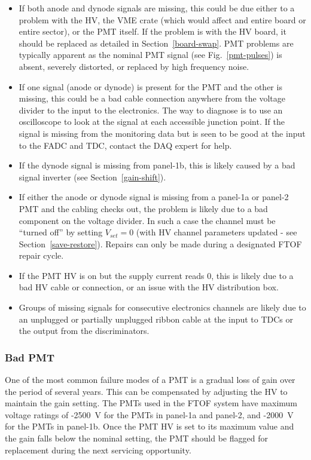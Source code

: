 \documentclass[12pt]{article}
\begin{document}
\begin{itemize}
\item If both anode and dynode signals are missing, this could be due either to a problem 
with the HV, the VME crate (which would affect and entire board or entire sector), or the 
PMT itself. If the problem is with the HV board, it should be replaced as detailed in 
Section~\ref{board-swap}. PMT problems are typically apparent as the nominal PMT signal 
(see Fig.~\ref{pmt-pulses}) is absent, severely distorted, or replaced by high frequency 
noise.
\item If one signal (anode or dynode) is present for the PMT and the other is missing, 
this could be a bad cable connection anywhere from the voltage divider to the input to 
the electronics. The way to diagnose is to use an oscilloscope to look at the signal at 
each accessible junction point. If the signal is missing from the monitoring data but is 
seen to be good at the input to the FADC and TDC, contact the DAQ expert for help.
\item If the dynode signal is missing from panel-1b, this is likely caused by a bad 
signal inverter (see Section~\ref{gain-shift}).
\item If either the anode or dynode signal is missing from a panel-1a or panel-2 PMT and 
the cabling checks out, the problem is likely due to a bad component on the voltage 
divider. In such a case the channel must be ``turned off'' by setting $V_{set}=0$ (with 
HV channel parameters updated - see Section~\ref{save-restore}). Repairs can only be 
made during a designated FTOF repair cycle.
\item If the PMT HV is on but the supply current reads 0, this is likely due to a bad 
HV cable or connection, or an issue with the HV distribution box.
\item Groups of missing signals for consecutive electronics channels are likely due to
an unplugged or partially unplugged ribbon cable at the input to TDCs or the output 
from the discriminators.
\end{itemize}

\subsubsection{Bad PMT}
\label{bad-pmt}

One of the most common failure modes of a PMT is a gradual loss of gain over the period 
of several years. This can be compensated by adjusting the HV to maintain the gain 
setting. The PMTs used in the FTOF system have maximum voltage ratings of -2500~V for 
the PMTs in panel-1a and panel-2, and -2000~V for the PMTs in panel-1b. Once the PMT HV 
is set to its maximum value and the gain falls below the nominal setting, the PMT should 
be flagged for replacement during the next servicing opportunity.
\end{document}
